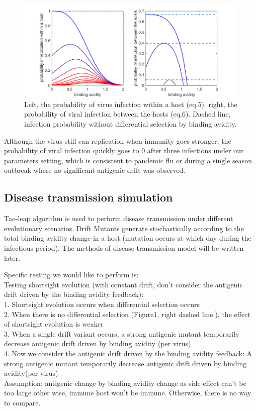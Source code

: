 \documentclass{article}
\begin{document}
\begin{figure}[h!]
        \includegraphics[width=1.2\textwidth,natwidth=8,natheight=10]{figure1.png}
        \caption{Left, the probability of virus infection within a host (eq.5). right, the probability of viral infection between the hosts (eq.6). Dashed line, infection probability without differential selection by binding avidity. }
\end{figure}

Although the virus still can replication when immunity goes stronger, the probability of viral infection quickly goes to 0 after three infections under our parameters setting, which is consistent to pandemic flu or during a single season outbreak where no significant antigenic drift was observed.
 
 
\subsection{Disease transmission simulation}
Tao-leap algorithm is used to perform disease transmission under different evolutionary scenarios. Drift Mutants generate stochastically according to the total binding avidity change in a host (mutation occurs at which day during the infectious period). The methods of disease transmission model will be written later.


Specific testing we would like to perform is: \\
Testing shortsight evolution (with constant drift, don't consider the antigenic drift driven by the binding avidity feedback):\\
1. Shortsight evolution occurs when differential selection occurs \\
2. When there is no differential selection (Figure1, right dashed line.), the effect of shortsight evolution is weaker \\
3. When a single drift variant occurs, a strong antigenic mutant temporarily decrease antigenic drift driven by binding avidity (per virus)  \\
4. Now we consider the antigenic drift driven by the binding avidity feedback: A strong antigenic mutant temporarily decrease antigenic drift driven by binding avidity(per virus)  \\


Assumption: antigenic change by binding avidity change as side effect can't be too large other wise, immune host won't be immune. Otherwise, there is no way to compare. 

                
\end{document}
